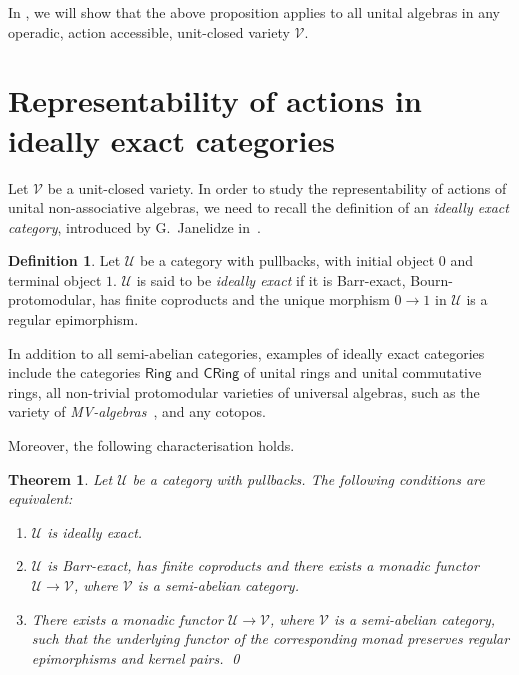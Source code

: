 \documentclass[reqno,a4paper]{amsart}
\theoremstyle{plain}
\newtheorem{theorem}[subsection]{Theorem}
\theoremstyle{definition}
\newtheorem{definition}[subsection]{Definition}
\theoremstyle{remark}
\numberwithin{equation}{section}
\newcommand{\noproof}{\hfil\qed}
\newcommand{\V}{\mathcal{V}}
\newcommand{\U}{\mathcal{U}}
\newcommand{\Ring}{\ensuremath{\mathsf{Ring}}}
\newcommand{\CRing}{\ensuremath{\mathsf{CRing}}}
\begin{document}
In , we will show that the above proposition applies to all unital algebras in any operadic, action accessible, unit-closed variety $\V$.

\section{Representability of actions in ideally exact categories}\label{SecIdEx}

Let $\V$ be a unit-closed variety. In order to study the representability of actions of unital non-associative algebras, we need to recall the definition of an \emph{ideally exact category}, introduced by G.~Janelidze in~\cite{IdeallyExact}.
 
\begin{definition}\cite{IdeallyExact}
Let $\U$ be a category with pullbacks, with initial object $0$ and terminal object $1$. $\U$ is said to be \textit{ideally exact} if it is Barr-exact, Bourn-protomodular, has finite coproducts and the unique morphism $0 \to 1$ in $\U$ is a regular epimorphism.
\end{definition}

In addition to all semi-abelian categories, examples of ideally exact categories include the categories $\Ring$ and $\CRing$ of unital rings and unital commutative rings, all non-trivial protomodular varieties of universal algebras, such as the variety of \emph{MV-algebras}~\cite{rel}, and any cotopos. 

Moreover, the following characterisation holds.
 
\begin{theorem}\cite{IdeallyExact}\label{carid}
Let $\U$ be a category with pullbacks. The following conditions are equivalent:
\begin{enumerate}
\item $\U$ is ideally exact.
\item $\U$ is Barr-exact, has finite coproducts and there exists a monadic functor $\U \to \V$, where $\V$ is a semi-abelian category.
\item There exists a monadic functor $\U \to \V$, where $\V$ is a semi-abelian category, such that the underlying functor of the corresponding monad preserves regular epimorphisms and kernel pairs. \noproof
\end{enumerate}
\end{theorem}
\end{document}
